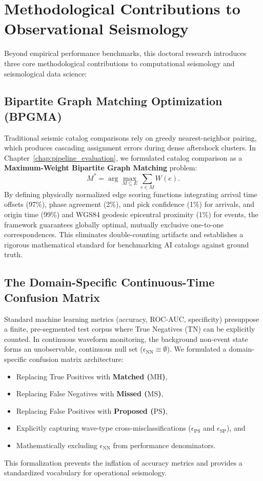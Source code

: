 \section{Methodological Contributions to Observational Seismology}
\label{sec:conclusion_methodology}

Beyond empirical performance benchmarks, this doctoral research
introduces three core methodological contributions to computational
seismology and seismological data science:

\subsection{Bipartite Graph Matching Optimization (BPGMA)}
Traditional seismic catalog comparisons rely on greedy
nearest-neighbor pairing, which produces cascading assignment errors
during dense aftershock clusters. In Chapter~\ref{chap:pipeline_evaluation},
we formulated catalog comparison as a \textbf{Maximum-Weight
Bipartite Graph Matching} problem:
\begin{equation}
  M^* = \arg\max_{M \subseteq E} \sum_{e \in M} W(e).
\end{equation}
By defining physically normalized edge scoring functions integrating
arrival time offsets (97\%), phase agreement (2\%), and pick
confidence (1\%) for arrivals, and origin time (99\%) and WGS84
geodesic epicentral proximity (1\%) for events, the framework
guarantees globally optimal, mutually exclusive one-to-one
correspondences. This eliminates double-counting artifacts and
establishes a rigorous mathematical standard for benchmarking AI
catalogs against ground truth.

\subsection{The Domain-Specific Continuous-Time Confusion Matrix}
Standard machine learning metrics (accuracy, ROC-AUC, specificity)
presuppose a finite, pre-segmented test corpus where True Negatives
($\mathrm{TN}$) can be explicitly counted. In continuous waveform
monitoring, the background non-event state forms an unobservable,
continuous null set ($\epsilon_{\mathrm{NN}} \equiv \emptyset$). We
formulated a domain-specific confusion matrix architecture:
\begin{itemize}
  \item Replacing True Positives with \textbf{Matched ($\mathrm{MH}$)},
  \item Replacing False Negatives with \textbf{Missed ($\mathrm{MS}$)},
  \item Replacing False Positives with \textbf{Proposed ($\mathrm{PS}$)},
  \item Explicitly capturing wave-type cross-misclassifications
    ($\epsilon_{\mathrm{PS}}$ and $\epsilon_{\mathrm{SP}}$), and
  \item Mathematically excluding $\epsilon_{\mathrm{NN}}$ from
    performance denominators.
\end{itemize}
This formalization prevents the inflation of accuracy metrics and
provides a standardized vocabulary for operational seismology.

